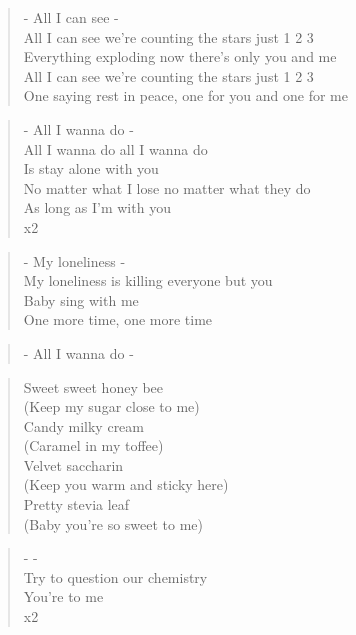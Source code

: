 
\begin{verse}
- All I can see -\\
All I can see we're counting the stars just 1 2 3\\
Everything exploding now there's only you and me\\
All I can see we're counting the stars just 1 2 3\\
One saying rest in peace, one for you and one for me
\end{verse}

\begin{verse}
- All I wanna do -\\
All I wanna do all I wanna do \\
Is stay alone with you\\
No matter what I lose no matter what they do \\
As long as I'm with you\\
x2
\end{verse}

\begin{verse}
- My loneliness -\\
My loneliness is killing everyone but you\\
Baby sing with me \\
One more time, one more time
\end{verse}

\begin{verse}
- All I wanna do - 
\end{verse}

\begin{verse}
Sweet sweet honey bee \\
(Keep my sugar close to me)\\
Candy milky cream \\
(Caramel in my toffee)\\
Velvet saccharin \\
(Keep you warm and sticky here)\\
Pretty stevia leaf \\
(Baby you're so sweet to me)
\end{verse}

\begin{verse}
-  - \\
Try to question our chemistry \\
You're  to me\\
x2
\end{verse}

